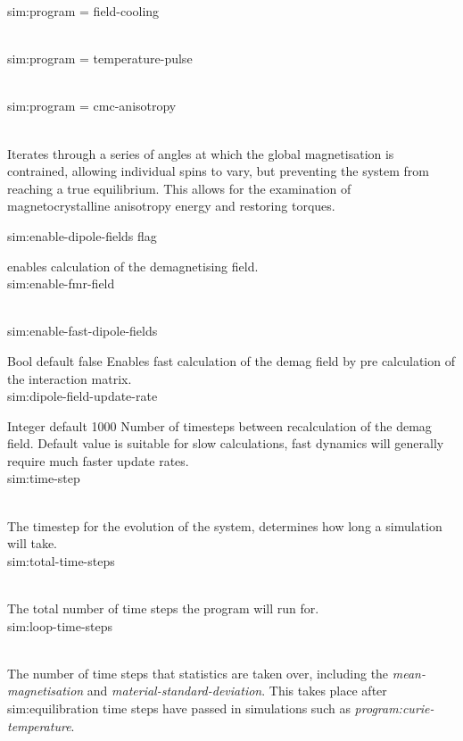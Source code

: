 {\zicf sim:program = field-cooling}
\\

{\zicf sim:program = temperature-pulse}\\

{\zicf sim:program = cmc-anisotropy}\\
   Iterates through a series of angles at which the global magnetisation is contrained, allowing individual spins to vary, but preventing the system from reaching a true equilibrium. This allows for the examination of magnetocrystalline anisotropy energy and restoring torques.

{\zicf sim:enable-dipole-fields flag} enables calculation of the demagnetising field.\\

{\zicf   sim:enable-fmr-field}\\

{\zicf   sim:enable-fast-dipole-fields}
     Bool default false
     Enables fast calculation of the demag field by pre calculation of the interaction matrix.\\

{\zicf sim:dipole-field-update-rate}
   Integer default 1000
   Number of timesteps between recalculation of the demag field. Default value is suitable for slow calculations, fast dynamics will generally require much faster update rates.\\

{\zicf sim:time-step}\\
   The timestep for the evolution of the system, determines how long a simulation will take.\\

{\zicf sim:total-time-steps}\\
   The total number of time steps the program will run for.\\

{\zicf sim:loop-time-steps}\\
The number of time steps that statistics are taken over, including the \textit{mean-magnetisation} and \textit{material-standard-deviation}. This takes place after sim:equilibration time steps have passed in simulations such as \textit{program:curie-temperature}.\\

